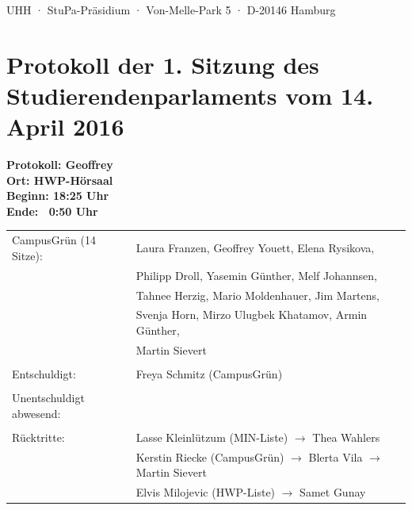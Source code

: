 \documentclass[ngerman,headheight=70pt]{scrartcl}
\begin{document}
    UHH · StuPa-Präsidium · Von-Melle-Park 5 · D-20146 Hamburg

    \section*{Protokoll der 1. Sitzung des Studierendenparlaments vom 14. April 2016}

    \textbf{Protokoll: Geoffrey}\\
    \textbf{Ort: HWP-Hörsaal}\\
    \textbf{Beginn: 18:25 Uhr}\\
    \textbf{Ende: ~0:50 Uhr}

    \vspace{0.5cm}
    \begin{tabular}{ll}
        CampusGrün (14 Sitze): & Laura Franzen, Geoffrey Youett, Elena Rysikova, \\
                                & Philipp Droll, Yasemin Günther, Melf Johannsen,\\
                                & Tahnee Herzig, Mario Moldenhauer, Jim Martens,\\
                                & Svenja Horn, Mirzo Ulugbek Khatamov, Armin Günther,\\
                                & Martin Sievert \\
                                &\\
        Entschuldigt: & Freya Schmitz (CampusGrün)\\
                                &\\
        Unentschuldigt abwesend: &\\
                                &\\
        Rücktritte: & Lasse Kleinlützum (MIN-Liste) \(\rightarrow\) Thea Wahlers \\
                    & Kerstin Riecke (CampusGrün) \(\rightarrow\) Blerta Vila \(\rightarrow\) Martin Sievert\\
                    & Elvis Milojevic (HWP-Liste) \(\rightarrow\) Samet Gunay
    \end{tabular}
\end{document}
